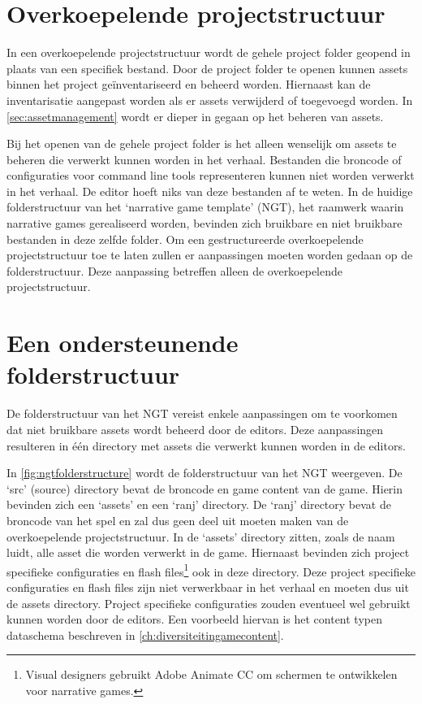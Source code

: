 \section{Overkoepelende projectstructuur}
In een overkoepelende projectstructuur wordt de gehele project folder geopend in plaats van een specifiek bestand. Door de project folder te openen kunnen assets binnen het project geïnventariseerd en beheerd worden. Hiernaast kan de inventarisatie aangepast worden als er assets verwijderd of toegevoegd worden. In \autoref{sec:assetmanagement} wordt er dieper in gegaan op het beheren van assets.

Bij het openen van de gehele project folder is het alleen wenselijk om assets te beheren die verwerkt kunnen worden in het verhaal. Bestanden die broncode of configuraties voor command line tools representeren kunnen niet worden verwerkt in het verhaal. De editor hoeft niks van deze bestanden af te weten. In de huidige folderstructuur van het ‘narrative game template’ (NGT), het raamwerk waarin narrative games gerealiseerd worden, bevinden zich bruikbare en niet bruikbare bestanden in deze zelfde folder. Om een gestructureerde overkoepelende projectstructuur toe te laten zullen er aanpassingen moeten worden gedaan op de folderstructuur. Deze aanpassing betreffen alleen de overkoepelende projectstructuur.

\section{Een ondersteunende folderstructuur}
De folderstructuur van het NGT vereist enkele aanpassingen om te voorkomen dat niet bruikbare assets wordt beheerd door de editors. Deze aanpassingen resulteren in één directory met assets die verwerkt kunnen worden in de editors.

In \autoref{fig:ngtfolderstructure} wordt de folderstructuur van het NGT weergeven. De ‘src’ (source) directory bevat de broncode en game content van de game. Hierin bevinden zich een ‘assets’ en een ‘ranj’ directory. De ‘ranj’ directory bevat de broncode van het spel en zal dus geen deel uit moeten maken van de overkoepelende projectstructuur. In de ‘assets’ directory zitten, zoals de naam luidt, alle asset die worden verwerkt in de game. Hiernaast bevinden zich project specifieke configuraties en flash files\footnote{Visual designers gebruikt Adobe Animate CC om schermen te ontwikkelen voor narrative games.} ook in deze directory. Deze project specifieke configuraties en flash files zijn niet verwerkbaar in het verhaal en moeten dus uit de assets directory. Project specifieke configuraties zouden eventueel wel gebruikt kunnen worden door de editors. Een voorbeeld hiervan is het content typen dataschema beschreven in \autoref{ch:diversiteitingamecontent}. 

